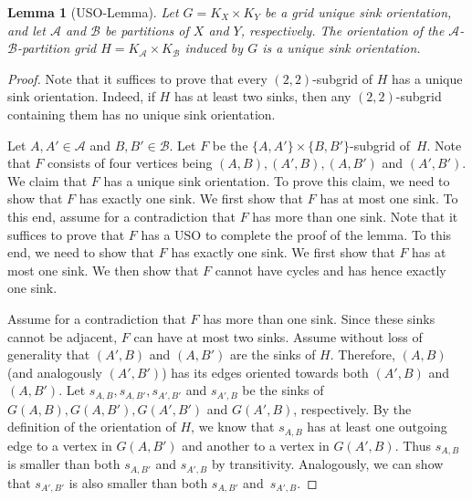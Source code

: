 \documentclass[a4paper,10pt]{article}
\newtheorem{lemma}{Lemma}
\newcommand{\A}{\ensuremath{\mathcal A}}
\newcommand{\B}{\ensuremath{\mathcal B}}
\newcommand{\s}[1]{\ensuremath{s_{\scriptscriptstyle#1}}}
\begin{document}
\begin{lemma}[USO-Lemma]\label{lemma:USO-Lemma}
Let $G = K_X \times K_Y$ be a grid unique sink orientation,
and let $\A$ and $\B$ be partitions of $X$ and $Y$, respectively.
The orientation of the $\A$-$\B$-partition grid $H = K_\A \times K_\B$ induced by $G$ is a unique sink orientation.
\end{lemma}
\begin{proof}
Note that it suffices to prove that every $(2,2)$-subgrid of $H$ has a unique sink orientation. Indeed, if $H$ has at least two sinks, then any $(2,2)$-subgrid containing them has no unique sink orientation.

Let $A, A'\in \A$ and $B,B'\in \B$. Let $F$ be the $\{A,A'\}\times\{B, B'\}$-subgrid of~$H$.
Note that $F$ consists of four vertices being $(A,B), (A', B), (A, B')$ and $(A', B')$.
We claim that $F$ has a unique sink orientation. 
To prove this claim, we need to show that $F$ has exactly one sink.
We first show that $F$ has at most one sink.
To this end, assume for a contradiction that $F$ has more than one sink.
Note that it suffices to prove that $F$ has a USO to complete the proof of the lemma. 
To this end, we need to show that $F$ has exactly one sink.
We first show that $F$ has at most one sink. We then show that $F$ cannot have cycles and has hence exactly one sink.

Assume for a contradiction that $F$ has more than one sink.
Since these sinks cannot be adjacent, $F$ can have at most two sinks. Assume without loss of generality that $(A',B)$ and $(A, B')$ are the sinks of $H$.
Therefore, $(A, B)$ (and analogously $(A', B')$) has its edges oriented towards both $(A',B)$ and $(A, B')$.
Let $\s{A,B}, \s{A,B'}, \s{A',B'}$ and $\s{A',B}$ be the sinks of $G(A,B), G(A,B'), G(A',B')$ and $G(A',B)$, respectively. 
By the definition of the orientation of $H$, we know that $\s{A,B}$ has at least one outgoing edge to a vertex in $G(A, B')$ and another to a vertex in $G(A', B)$. 
Thus $\s{A,B}$ is smaller than both $\s{A,B'}$ and $\s{A',B}$ by transitivity. 
Analogously, we can show that $\s{A',B'}$ is also smaller than both $\s{A,B'}$ and~$\s{A',B}$. 


\end{proof}
\end{document}
